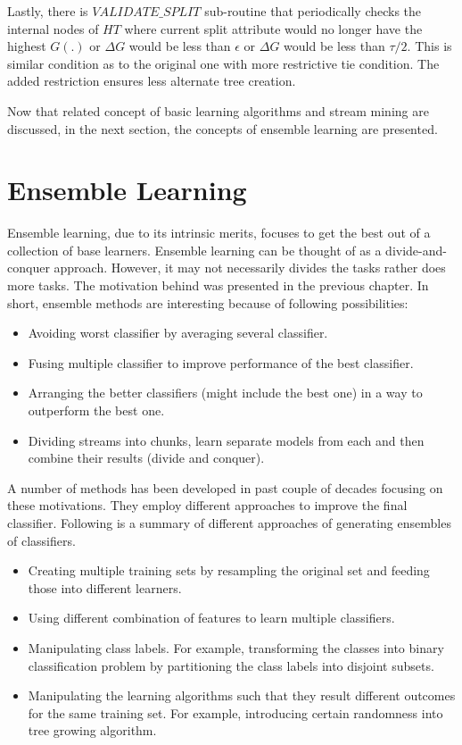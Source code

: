 \documentclass[a4paper, 11pt, oneside]{book}
\begin{document}
Lastly, there is $VALIDATE\_SPLIT$ sub-routine that periodically checks the internal nodes of $HT$ where current split attribute would no longer have the highest $G(.)$ or $\Delta G$ would be less than $\epsilon$ or $\Delta G$ would be less than $\tau/2$. This is similar condition as to the original one with more restrictive tie condition. The added restriction ensures less alternate tree creation.

Now that related concept of basic learning algorithms and stream mining are discussed, in the next section, the concepts of ensemble learning are presented.

\section{Ensemble Learning}
Ensemble learning, due to its intrinsic merits, focuses to get the best out of a collection of base learners. Ensemble learning can be thought of as a divide-and-conquer approach. However, it may not necessarily divides the tasks rather does more tasks. The motivation behind was presented in the previous chapter. In short, ensemble methods are interesting because of following possibilities:
\begin{itemize}
    \item Avoiding worst classifier by averaging several classifier.
    \item Fusing multiple classifier to improve performance of the best classifier.
    \item Arranging the better classifiers (might include the best one) in a way to outperform the best one.
    \item Dividing streams into chunks, learn separate models from each and then combine their results (divide and conquer).
\end{itemize}

A number of methods has been developed in past couple of decades focusing on these motivations. They employ different approaches to improve the final classifier. Following is a summary of different approaches of generating ensembles of classifiers.
\begin{itemize}
    \item Creating multiple training sets by resampling the original set and feeding those into different learners.
    \item Using different combination of features to learn multiple classifiers.
    \item Manipulating class labels. For example, transforming the classes into binary classification problem by partitioning the class labels into disjoint subsets.
    \item Manipulating the learning algorithms such that they result different outcomes for the same training set. For example, introducing certain randomness into tree growing algorithm.
\end{itemize}
\end{document}
